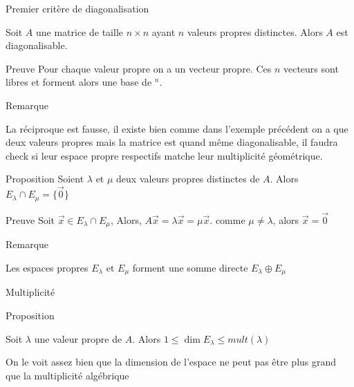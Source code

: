 \begin{parag}{Premier critère de diagonalisation}
    \begin{theoreme}
        Soit $A$ une matrice de taille $n \times n$ ayant $n$ valeurs propres distinctes. Alors $A$ est diagonalisable.
    \end{theoreme}
    \begin{subparag}{Preuve}
        Pour chaque valeur propre on a un vecteur propre. Ces $n$ vecteurs sont libres et forment alors une base de \R$^n$.
    \end{subparag}
        \begin{subparag}{Remarque}
        \begin{framedremark}
        La réciproque est fausse, il existe bien comme dans l'exemple précédent on a que deux valeurs propres mais la matrice est quand même diagonalisable, il faudra check si leur espace propre respectifs matche leur multiplicité géométrique.
        \end{framedremark}
    \end{subparag}

    \begin{subparag}{Proposition}
        Soient $\lambda$ et $\mu$ deux valeurs propres distinctes de $A$. Alors $E_\lambda \cap E_\mu = \{\vec{0}\}$
    \end{subparag}
    \begin{subparag}{Preuve}
        Soit $\vec{x} \in E_\lambda \cap E_\mu$, Alors, $A\vec{x} = \lambda\vec{x} = \mu\vec{x}$. comme $\mu \neq \lambda$, alors $\vec{x}= \vec{0}$
    \end{subparag}
    \begin{subparag}{Remarque}
        \begin{framedremark}
            Les espaces propres $E_\lambda$ et $E_\mu$ forment une somme directe $E_\lambda \oplus E_\mu$
        \end{framedremark}
    \end{subparag}
\end{parag}

\begin{parag}{Multiplicité}
    \begin{subparag}{Proposition}
    \begin{theoreme}
        Soit $\lambda$ une valeur propre de $A$. Alors $1 \leq \dim E_\lambda \leq mult(\lambda)$
    \end{theoreme}
    On le voit assez bien que la dimension de l'espace ne peut pas être plus grand que la multiplicité algébrique
    \end{subparag}
    
\end{parag}



